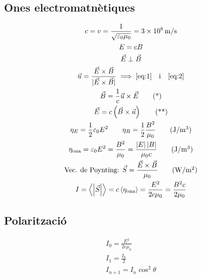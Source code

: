 \documentclass[10pt,twocolumn]{article}
\begin{document}
\subsection{Ones electromatnètiques}
\begin{gather*}
    c = v = \frac{1}{\sqrt{\varepsilon_0 \mu_0}} = \SI{3e8}{\meter/\second} \\
    E = cB \\
    \vec{E} \perp \vec{B} \\
    \vec{u} = \frac{\vec{E}\times\vec{B}}{|\vec{E}\times\vec{B}|} \implies \ref{eq:1} \quad \text{i} \quad \ref{eq:2}\\
    \vec{B} = \frac{1}{c}\vec{u}\times\vec{E}\tag{*}\label{eq:1} \\
    \vec{E} = c\left(\vec{B}\times\vec{u}\right) \tag{**}\label{eq:2} \\
    \eta_E = \frac{1}{2}\varepsilon_0 E^2 \qquad \eta_B = \frac{1}{2} \frac{B^2}{\mu_0} \tag{\si{J/m^3}}\\
    \eta_\text{ona} = \varepsilon_0E^2 = \frac{B^2}{\mu_0} = \frac{\left|E\right|\left|B\right|}{\mu_0 c} \tag{\si{J/m^3}} \\
    \text{Vec. de Poynting: } \vec{S} = \frac{\vec{E}\times\vec{B}}{\mu_0} \tag{\si{W/m^2}} \\
    I = \left<\left|\vec{S}\right|\right> = c\left<\eta_\text{ona}\right> = \frac{E^2}{2c\mu_0} = \frac{B^2 c}{2\mu_0}
\end{gather*}
\subsection{Polarització}
\begin{gather*}
    I_0 = \frac{E^2}{2c\mu_0} \\
    I_1 = \frac{I_0}{2} \\
    I_{n+1} = I_n \cos^2 \theta
\end{gather*}
\end{document}
